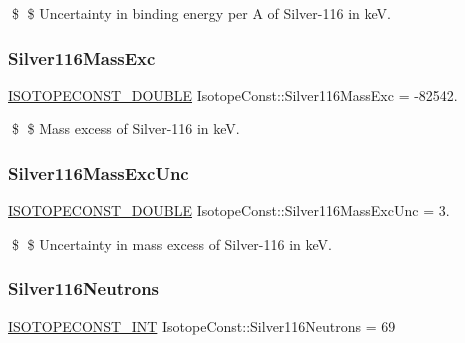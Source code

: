 \$ \$ Uncertainty in binding energy per A of Silver-\/116 in keV. \mbox{\label{group___isotope_const-_silver-_ag116_ga30c624eba67f3a08fce0fbc9ba620555}} 
\subsubsection{\texorpdfstring{Silver116\+Mass\+Exc}{Silver116MassExc}}
{\footnotesize\ttfamily \mbox{\hyperlink{group___isotope_const-_macros_ga8f45a7272ce02c0b4c65c44636ed719a}{I\+S\+O\+T\+O\+P\+E\+C\+O\+N\+S\+T\+\_\+\+D\+O\+U\+B\+LE}} Isotope\+Const\+::\+Silver116\+Mass\+Exc = -\/82542.}

\$ \$ Mass excess of Silver-\/116 in keV. \mbox{\label{group___isotope_const-_silver-_ag116_ga2871d0f3c23dfc25558692f8940b4f65}} 
\subsubsection{\texorpdfstring{Silver116\+Mass\+Exc\+Unc}{Silver116MassExcUnc}}
{\footnotesize\ttfamily \mbox{\hyperlink{group___isotope_const-_macros_ga8f45a7272ce02c0b4c65c44636ed719a}{I\+S\+O\+T\+O\+P\+E\+C\+O\+N\+S\+T\+\_\+\+D\+O\+U\+B\+LE}} Isotope\+Const\+::\+Silver116\+Mass\+Exc\+Unc = 3.}

\$ \$ Uncertainty in mass excess of Silver-\/116 in keV. \mbox{\label{group___isotope_const-_silver-_ag116_gae599f76813d78198666cad759de8ec45}} 
\subsubsection{\texorpdfstring{Silver116\+Neutrons}{Silver116Neutrons}}
{\footnotesize\ttfamily \mbox{\hyperlink{group___isotope_const-_macros_ga5f18360b3e99483a35c32d789e62621c}{I\+S\+O\+T\+O\+P\+E\+C\+O\+N\+S\+T\+\_\+\+I\+NT}} Isotope\+Const\+::\+Silver116\+Neutrons = 69}

